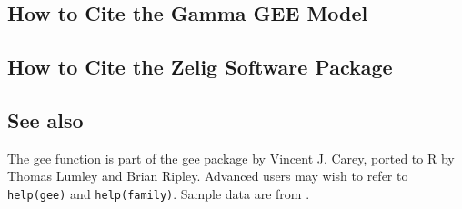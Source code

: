 \subsection*{How to Cite the Gamma GEE Model}

\subsection*{How to Cite the Zelig Software Package}
\CiteZelig

\subsection*{See also}
The gee function is part of the gee package by Vincent J. Carey, ported to R by Thomas Lumley and Brian Ripley.  Advanced users may wish to refer to \texttt{help(gee)} and \texttt{help(family)}.  Sample data are from \cite{KinTomWit00}.







